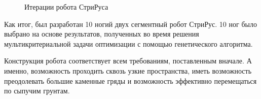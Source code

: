 \begin{figure}[H]
    \caption{Итерации робота СтриРуса}\label{fig:striruses}
  \end{figure}

Как итог, был разработан 10 ногий двух сегментный робот СтриРус. 10 ног было выбрано на основе результатов, полученных во время решения мультикритериальной задачи оптимизации с помощью генетического алгоритма.

Конструкция робота соответствует всем требованиям, поставленным вначале. А именно, возможность проходить сквозь узкие пространства, иметь возможность преодолевать большие каменные гряды и возможность эффективно перемещаться по сыпучим грунтам.


